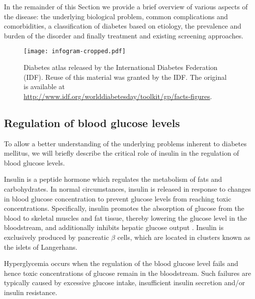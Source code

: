 In the remainder of this Section we provide a brief overview of various aspects of the disease: the underlying biological problem, common complications and comorbidities, a classification of diabetes based on etiology, the prevalence and burden of the disorder and finally treatment and existing screening approaches.

\begin{figure}[p]
  \centering
  \texttt{[image: infogram-cropped.pdf]}
  \caption{Diabetes atlas released by the International Diabetes Federation (IDF). Reuse of this material was granted by the IDF. The original is available at \url{http://www.idf.org/worlddiabetesday/toolkit/gp/facts-figures}.} 
  \label{intro:diabetes-infogram}
\end{figure}



\subsection{Regulation of blood glucose levels}
To allow a better understanding of the underlying problems inherent to diabetes mellitus, we will briefly describe the critical role of insulin in the regulation of blood glucose levels.

Insulin is a peptide hormone which regulates the metabolism of fats and carbohydrates. In normal circumstances, insulin is released in response to changes in blood glucose concentration to prevent glucose levels from reaching toxic concentrations. Specifically, insulin promotes the absorption of glucose from the blood to skeletal muscles and fat tissue, thereby lowering the glucose level in the bloodstream, and additionally inhibits hepatic glucose output \citep{sonksen2000insulin}. Insulin is exclusively produced by pancreatic $\beta$ cells, which are located in clusters known as the islets of Langerhans. 

Hyperglycemia occurs when the regulation of the blood glucose level fails and hence toxic concentrations of glucose remain in the bloodstream. Such failures are typically caused by excessive glucose intake, insufficient insulin secretion and/or insulin resistance. 


